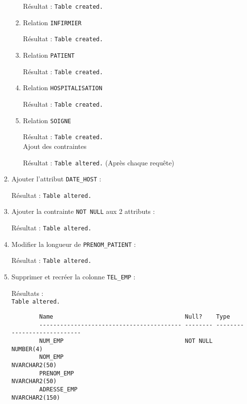 \documentclass[12pt,a4paper]{article}
\begin{document}
\begin{enumerate}
\begin{enumerate}
					
						Résultat : \texttt{Table created.}
				\item Relation \texttt{INFIRMIER}
					
						Résultat : \texttt{Table created.}
				\item Relation \texttt{PATIENT}
					
						Résultat : \texttt{Table created.}
				\item Relation \texttt{HOSPITALISATION}
					
						Résultat : \texttt{Table created.}
				\item Relation \texttt{SOIGNE}
					
						Résultat : \texttt{Table created.}\\
				Ajout des contraintes
				
				Résultat : \texttt{Table altered.} (Après chaque requête)
			\end{enumerate}
		\item Ajouter l'attribut \texttt{DATE\_HOST} :
		
		Résultat : \texttt{Table altered.}
		\item Ajouter la contrainte \texttt{NOT NULL} aux 2 attributs :
		
		Résultat : \texttt{Table altered.}
		\item Modifier la longueur de \texttt{PRENOM\_PATIENT} :
		
		Résultat : \texttt{Table altered.}
		\item Supprimer et recréer la colonne \texttt{TEL\_EMP} :
		
		Résultats :\\
		\texttt{Table altered.}
		\begin{verbatim}
		Name                                      Null?    Type
		----------------------------------------- -------- ----------------------------
		NUM_EMP                                   NOT NULL NUMBER(4)
		NOM_EMP                                            NVARCHAR2(50)
		PRENOM_EMP                                         NVARCHAR2(50)
		ADRESSE_EMP                                        NVARCHAR2(150)

\end{verbatim}
\end{enumerate}
\end{document}
